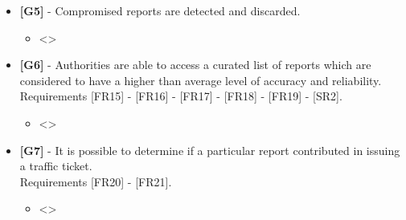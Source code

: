 \begin{itemize}[label={}]
    \item {\textbf{[G5]}} - Compromised reports are detected and discarded.

    \begin{itemize}
        \item 
        <>
    \end{itemize}

    \item {\textbf{[G6]}} - Authorities are able to access a curated list of reports which are considered to have a higher than average level of accuracy and reliability.\\
    Requirements [FR15] - [FR16] - [FR17] - [FR18] - [FR19] - [SR2].

    \begin{itemize}
        \item 
        <>
    \end{itemize}

    \item {\textbf{[G7]}} - It is possible to determine if a particular report contributed in issuing a traffic ticket.\\
    Requirements [FR20] - [FR21].

    \begin{itemize}
        \item 
        <>
    \end{itemize}

\end{itemize}